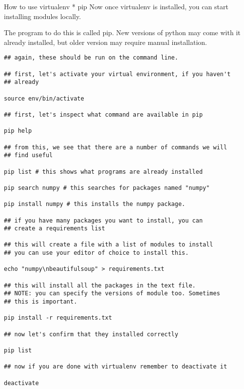 \documentclass[presentation,smaller]{beamer}
\begin{document}
\begin{frame}[fragile,label=sec-5]{How to use virtualenv * pip}
 Now once virtualenv is installed, you can start installing modules
locally. 

The program to do this is called pip. New versions of python may come
with it already installed, but older version may require manual 
installation. 

\lstset{numbers=left,language=sh}
\begin{lstlisting}
## again, these should be run on the command line. 

## first, let's activate your virtual environment, if you haven't 
## already

source env/bin/activate

## first, let's inspect what command are available in pip

pip help

## from this, we see that there are a number of commands we will 
## find useful

pip list # this shows what programs are already installed

pip search numpy # this searches for packages named "numpy"

pip install numpy # this installs the numpy package. 

## if you have many packages you want to install, you can 
## create a requirements list

## this will create a file with a list of modules to install
## you can use your editor of choice to install this. 

echo "numpy\nbeautifulsoup" > requirements.txt

## this will install all the packages in the text file. 
## NOTE: you can specify the versions of module too. Sometimes
## this is important. 

pip install -r requirements.txt

## now let's confirm that they installed correctly

pip list 

## now if you are done with virtualenv remember to deactivate it

deactivate
\end{lstlisting}
\end{frame}
\end{document}

